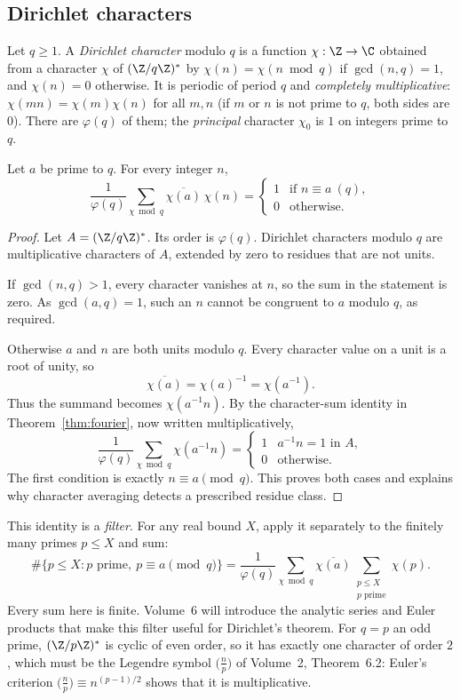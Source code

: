 \subsection*{Dirichlet characters}

Let $q\ge1$. A \emph{Dirichlet character} modulo $q$ is a function $\chi:\Z\to\C$ obtained from a character $\chi$ of $(\Z/q\Z)^*$ by $\chi(n)=\chi(n\bmod q)$ if $\gcd(n,q)=1$, and $\chi(n)=0$ otherwise. It is periodic of period $q$ and \emph{completely multiplicative}: $\chi(mn)=\chi(m)\chi(n)$ for all $m,n$ (if $m$ or $n$ is not prime to $q$, both sides are $0$). There are $\varphi(q)$ of them; the \emph{principal} character $\chi_0$ is $1$ on integers prime to $q$.

\begin{proposition}\label{prop:dirichletorth}
Let $a$ be prime to $q$. For every integer $n$,
\[
\frac1{\varphi(q)}\sum_{\chi\bmod q}\overline{\chi(a)}\,\chi(n)=\begin{cases}1&\text{if }n\equiv a\ (q),\\0&\text{otherwise.}\end{cases}
\]
\end{proposition}
\begin{proof}
Let $A=(\Z/q\Z)^*$.
Its order is $\varphi(q)$.
Dirichlet characters modulo $q$
are multiplicative characters
of $A$, extended by zero to
residues that are not units.

If $\gcd(n,q)>1$, every character
vanishes at $n$, so the sum in
the statement is zero. As
$\gcd(a,q)=1$, such an $n$
cannot be congruent to $a$
modulo $q$, as required.

Otherwise $a$ and $n$ are
both units modulo $q$.
Every character value on a
unit is a root of unity, so
\[
\overline{\chi(a)}
=\chi(a)^{-1}=\chi(a^{-1}).
\]
Thus the summand becomes
$\chi(a^{-1}n)$. By the
character-sum identity in
Theorem~\ref{thm:fourier},
now written multiplicatively,
\[
\frac1{\varphi(q)}
\sum_{\chi\bmod q}\chi(a^{-1}n)
=\begin{cases}
1&a^{-1}n=1\text{ in }A,\\
0&\text{otherwise}.
\end{cases}
\]
The first condition is exactly
$n\equiv a\pmod q$.
This proves both cases and
explains why character averaging
detects a prescribed residue class.
\end{proof}

This identity is a \emph{filter}. For any real bound $X$, apply it separately
to the finitely many primes $p\le X$ and sum:
\[
\#\{p\le X:p\text{ prime},\ p\equiv a\pmod q\}
=\frac1{\varphi(q)}\sum_{\chi\bmod q}\overline{\chi(a)}
\sum_{\substack{p\le X\\p\text{ prime}}}\chi(p).
\]
Every sum here is finite. Volume~6 will introduce the analytic series and
Euler products that make this filter useful for Dirichlet's theorem. For $q=p$ an odd prime, $(\Z/p\Z)^*$ is cyclic of even order, so it has exactly one character of order $2$, which must be the Legendre symbol $\bigl(\frac np\bigr)$ of Volume~2, Theorem~6.2: Euler's criterion $\bigl(\frac np\bigr)\equiv n^{(p-1)/2}$ shows that it is multiplicative.

